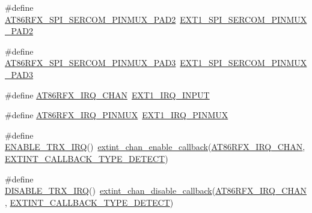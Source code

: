 \begin{DoxyCompactItemize}
\item 
\#define \mbox{\hyperlink{group__samd21__xplained__pro__group_gaeed3fcc3f0aebb0c50de4b519e2ccf6e}{A\+T86\+R\+F\+X\+\_\+\+S\+P\+I\+\_\+\+S\+E\+R\+C\+O\+M\+\_\+\+P\+I\+N\+M\+U\+X\+\_\+\+P\+A\+D2}}~\mbox{\hyperlink{group__samd21__xplained__pro__features__group_ga6e40d3a1db63f7144c61706f13fd0164}{E\+X\+T1\+\_\+\+S\+P\+I\+\_\+\+S\+E\+R\+C\+O\+M\+\_\+\+P\+I\+N\+M\+U\+X\+\_\+\+P\+A\+D2}}
\item 
\#define \mbox{\hyperlink{group__samd21__xplained__pro__group_ga0b78192d3c3fc085a26035ccfa5571dc}{A\+T86\+R\+F\+X\+\_\+\+S\+P\+I\+\_\+\+S\+E\+R\+C\+O\+M\+\_\+\+P\+I\+N\+M\+U\+X\+\_\+\+P\+A\+D3}}~\mbox{\hyperlink{group__samd21__xplained__pro__features__group_ga6a6ce015c66176cb4e9497d5d11bc0f7}{E\+X\+T1\+\_\+\+S\+P\+I\+\_\+\+S\+E\+R\+C\+O\+M\+\_\+\+P\+I\+N\+M\+U\+X\+\_\+\+P\+A\+D3}}
\item 
\#define \mbox{\hyperlink{group__samd21__xplained__pro__group_ga59510bd28b7214b82000a06004731a8d}{A\+T86\+R\+F\+X\+\_\+\+I\+R\+Q\+\_\+\+C\+H\+AN}}~\mbox{\hyperlink{group__samd21__xplained__pro__features__group_gae7ca49f8ea06da930916046cbcde0529}{E\+X\+T1\+\_\+\+I\+R\+Q\+\_\+\+I\+N\+P\+UT}}
\item 
\#define \mbox{\hyperlink{group__samd21__xplained__pro__group_ga64f579efeb48640056d9e2ddc9702a3b}{A\+T86\+R\+F\+X\+\_\+\+I\+R\+Q\+\_\+\+P\+I\+N\+M\+UX}}~\mbox{\hyperlink{group__samd21__xplained__pro__features__group_ga556d8241bd3ae14ae5397437a8e9c9d3}{E\+X\+T1\+\_\+\+I\+R\+Q\+\_\+\+P\+I\+N\+M\+UX}}
\item 
\#define \mbox{\hyperlink{group__samd21__xplained__pro__group_ga8552a5a8c813e41b26a578bfde4652d1}{E\+N\+A\+B\+L\+E\+\_\+\+T\+R\+X\+\_\+\+I\+RQ}}()~\mbox{\hyperlink{group__asfdoc__sam0__extint__group_ga09e5568abbb3e5042b1048774a605ea4}{extint\+\_\+chan\+\_\+enable\+\_\+callback}}(\mbox{\hyperlink{group__samd21__xplained__pro__group_ga59510bd28b7214b82000a06004731a8d}{A\+T86\+R\+F\+X\+\_\+\+I\+R\+Q\+\_\+\+C\+H\+AN}}, \mbox{\hyperlink{group__asfdoc__sam0__extint__group_ggaf22af5117db5d011b371b05dfa8b50e3ac2e35708fbb9eb31b2a664817f108b2d}{E\+X\+T\+I\+N\+T\+\_\+\+C\+A\+L\+L\+B\+A\+C\+K\+\_\+\+T\+Y\+P\+E\+\_\+\+D\+E\+T\+E\+CT}})
\item 
\#define \mbox{\hyperlink{group__samd21__xplained__pro__group_gab49d5c31d1feeaf423b2b303f3bef6cf}{D\+I\+S\+A\+B\+L\+E\+\_\+\+T\+R\+X\+\_\+\+I\+RQ}}()~\mbox{\hyperlink{group__asfdoc__sam0__extint__group_ga939803cc928def37adf4f22bc727e8f7}{extint\+\_\+chan\+\_\+disable\+\_\+callback}}(\mbox{\hyperlink{group__samd21__xplained__pro__group_ga59510bd28b7214b82000a06004731a8d}{A\+T86\+R\+F\+X\+\_\+\+I\+R\+Q\+\_\+\+C\+H\+AN}}, \mbox{\hyperlink{group__asfdoc__sam0__extint__group_ggaf22af5117db5d011b371b05dfa8b50e3ac2e35708fbb9eb31b2a664817f108b2d}{E\+X\+T\+I\+N\+T\+\_\+\+C\+A\+L\+L\+B\+A\+C\+K\+\_\+\+T\+Y\+P\+E\+\_\+\+D\+E\+T\+E\+CT}})

\end{DoxyCompactItemize}
